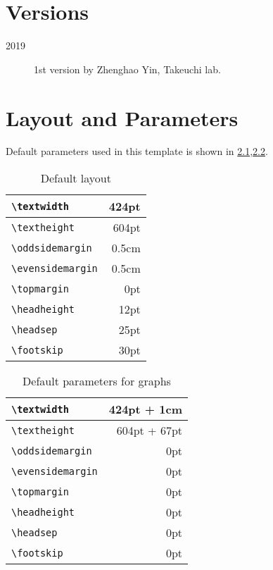\documentclass[final]{kuee_en}
\begin{document}
\begin{appendices}
\chapter{Versions}
\begin{description}
  \item[2019] 1st version by Zhenghao Yin, Takeuchi lab.
\end{description}


\chapter{Layout and Parameters}
Default parameters used in this template is shown in \ref{tab:text},\ref{tab:fig}.

\begin{table}
  \caption{Default layout}\label{tab:text}
  \begin{center}
    \begin{tabular}{|l|r|}
      \hline
      \verb+\textwidth+ & 424pt \\ \hline
      \verb+\textheight+ & 604pt \\ \hline
      \verb+\oddsidemargin+ & 0.5cm \\ \hline
      \verb+\evensidemargin+ & 0.5cm \\ \hline
      \verb+\topmargin+ & 0pt \\ \hline
      \verb+\headheight+ &12pt \\ \hline
      \verb+\headsep+ & 25pt \\ \hline
      \verb+\footskip+ & 30pt \\ \hline
    \end{tabular}
  \end{center}
\end{table}

\begin{table}
  \caption{Default parameters for graphs}\label{tab:fig}
  \begin{center}
    \begin{tabular}{|l|r|}
      \hline
      \verb+\textwidth+ & 424pt + 1cm \\ \hline
      \verb+\textheight+ & 604pt + 67pt \\ \hline
      \verb+\oddsidemargin+ & 0pt \\ \hline
      \verb+\evensidemargin+ & 0pt \\ \hline
      \verb+\topmargin+ & 0pt \\ \hline
      \verb+\headheight+ & 0pt \\ \hline
      \verb+\headsep+ & 0pt \\ \hline
      \verb+\footskip+ & 0pt \\ \hline
    \end{tabular}
  \end{center}
\end{table}
\end{appendices}
\end{document}
